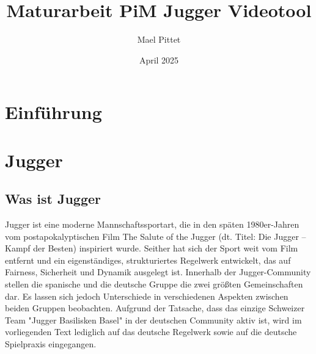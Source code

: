 \documentclass{article}
\title{Maturarbeit PiM Jugger Videotool}
\author{Mael Pittet}
\date{April 2025}
\begin{document}
\maketitle

\section{Einführung}
\section{Jugger}
\subsection{Was ist Jugger}
Jugger ist eine moderne Mannschaftssportart, die in den späten 1980er-Jahren vom postapokalyptischen Film The Salute of the Jugger (dt. Titel: Die Jugger – Kampf der Besten) inspiriert wurde. Seither hat sich der Sport weit vom Film entfernt und ein eigenständiges, strukturiertes Regelwerk entwickelt, das auf Fairness, Sicherheit und Dynamik ausgelegt ist. Innerhalb der Jugger-Community stellen die spanische und die deutsche Gruppe die zwei größten Gemeinschaften dar. Es lassen sich jedoch Unterschiede in verschiedenen Aspekten zwischen beiden Gruppen beobachten. Aufgrund der Tatsache, dass das einzige Schweizer Team "Jugger Basilisken Basel" in der deutschen Community aktiv ist, wird im vorliegenden Text lediglich auf das deutsche Regelwerk sowie auf die deutsche Spielpraxis eingegangen.
\end{document}

